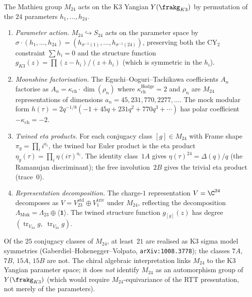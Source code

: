 \begin{conjecture}
\label{conj:mathieu-moonshine-yangian}
The Mathieu group $M_{24}$ acts on the K3 Yangian $Y(\frakg_{K3})$ by
permutation of the $24$ parameters $h_1, \ldots, h_{24}$.
\begin{enumerate}[label=\textup{(\alph*)}]
 \item \emph{Parameter action.}
 $M_{24} \hookrightarrow S_{24}$ acts on the parameter space by
 $\sigma \cdot (h_1, \ldots, h_{24}) = (h_{\sigma^{-1}(1)}, \ldots,
 h_{\sigma^{-1}(24)})$, preserving both the CY$_2$ constraint
 $\sum h_i = 0$ and the structure function
 $g_{K3}(z) = \prod (z - h_i)/(z + h_i)$ (which is symmetric in the $h_i$).

 \item \emph{Moonshine factorisation.}
 The Eguchi--Ooguri--Tachikawa coefficients $A_n$ factorise as
 $A_n = \kappa_{\mathrm{ch}} \cdot \dim(\rho_n)$ where
 $\kappa_{\mathrm{ch}}^{\mathrm{Hodge}} = 2$ and $\rho_n$ are $M_{24}$ representations
 of dimensions $a_n = 45, 231, 770, 2277, \ldots$.
 The mock modular form
 $h(\tau) = 2 q^{-1/8}(-1 + 45q + 231q^2 + 770q^3 + \cdots)$
 has polar coefficient $-\kappa_{\mathrm{ch}} = -2$.

 \item \emph{Twined eta products.}
 For each conjugacy class $[g] \in M_{24}$ with Frame shape
 $\pi_g = \prod_i i^{a_i}$, the twined bar Euler product is the eta
 product $\eta_g(\tau) = \prod_{i} \eta(i\tau)^{a_i}$.
 The identity class~$1A$ gives $\eta(\tau)^{24} = \Delta(q)/q$
 (the Ramanujan discriminant); the free involution~$2B$ gives
 the trivial eta product (trace~$0$).

 \item \emph{Representation decomposition.}
 The charge-$1$ representation $V = \C^{24}$ decomposes as
 $V = V_{23}^{\mathrm{std}} \oplus V_1^{\mathrm{triv}}$
 under $M_{24}$, reflecting the decomposition
 $\Lambda_{\mathrm{Muk}} = \Lambda_{23} \oplus \langle\mathbf{1}\rangle$.
 The twined structure function $g_{[g]}(z)$ has
 degree $(\operatorname{tr}_{V_{24}} g,\; \operatorname{tr}_{V_{24}} g)$.
\end{enumerate}

Of the $25$ conjugacy classes of $M_{24}$, at least~$21$ are realised as
K3 sigma model symmetries (Gaberdiel--Hohenegger--Volpato,
\texttt{arXiv:1008.3778}); the classes $7A$, $7B$, $15A$, $15B$ are not.
The chiral algebraic interpretation links $M_{24}$ to the K3 Yangian
parameter space; it does \emph{not} identify $M_{24}$ as an automorphism
group of $Y(\frakg_{K3})$ (which would require $M_{24}$-equivariance of
the RTT presentation, not merely of the parameters).


\end{conjecture}
